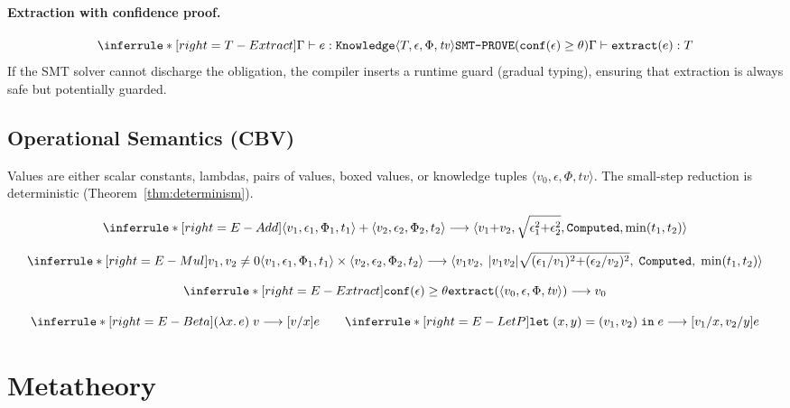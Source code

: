 \documentclass[acmsmall,screen,review,anonymous]{acmart}
\newcommand{\knowfull}[4]{\texttt{Knowledge}\langle #1, #2, #3, #4 \rangle}
\newcommand{\eps}{\epsilon}
\begin{document}
\paragraph{Extraction with confidence proof.}
\[
\inferrule*[right=T-Extract]
  {\Gamma \vdash e : \knowfull{T}{\eps}{\Phi}{\mathit{tv}} \\
   \texttt{SMT-PROVE}(\texttt{conf}(\eps) \geq \theta)}
  {\Gamma \vdash \texttt{extract}(e) : T}
\]
If the SMT solver cannot discharge the obligation, the compiler inserts
a runtime guard (gradual typing), ensuring that extraction is always
safe but potentially guarded.

\subsection{Operational Semantics (CBV)}

Values are either scalar constants, lambdas, pairs of values, boxed values,
or knowledge tuples $\langle v_0, \eps, \Phi, \mathit{tv} \rangle$.
The small-step reduction is deterministic (Theorem~\ref{thm:determinism}).

\[
\inferrule*[right=E-Add]
  { }
  {\langle v_1, \eps_1, \Phi_1, t_1 \rangle + \langle v_2, \eps_2, \Phi_2, t_2 \rangle
   \longrightarrow
   \langle v_1{+}v_2, \sqrt{\eps_1^2{+}\eps_2^2}, \texttt{Computed}, \min(t_1,t_2) \rangle}
\]

\[
\inferrule*[right=E-Mul]
  {v_1, v_2 \neq 0}
  {\langle v_1, \eps_1, \Phi_1, t_1 \rangle \times \langle v_2, \eps_2, \Phi_2, t_2 \rangle
   \longrightarrow
   \langle v_1 v_2,\;
   |v_1 v_2| \sqrt{(\eps_1/v_1)^2{+}(\eps_2/v_2)^2},\;
   \texttt{Computed},\;
   \min(t_1,t_2) \rangle}
\]

\[
\inferrule*[right=E-Extract]
  {\texttt{conf}(\eps) \geq \theta}
  {\texttt{extract}(\langle v_0, \eps, \Phi, \mathit{tv} \rangle)
   \longrightarrow v_0}
\]

\[
\inferrule*[right=E-Beta]
  { }
  {(\lambda x.\, e)\; v \longrightarrow [v/x]e}
\qquad
\inferrule*[right=E-LetP]
  { }
  {\texttt{let}\; (x,y) = (v_1, v_2) \;\texttt{in}\; e \longrightarrow [v_1/x, v_2/y]e}
\]

\section{Metatheory}
\label{sec:metatheory}
\end{document}
